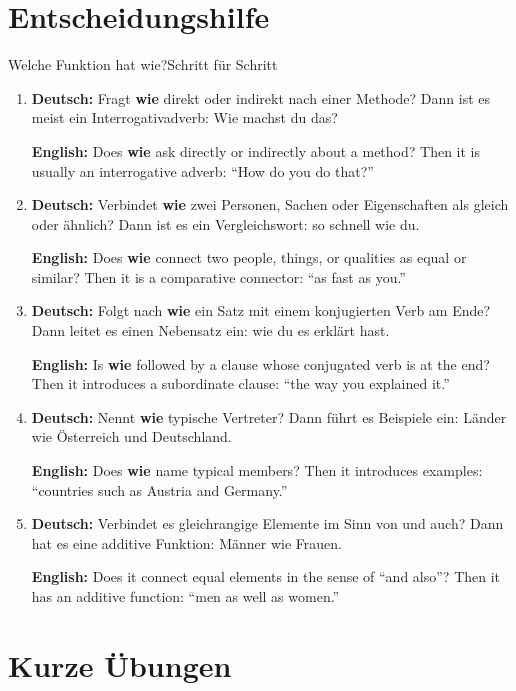 \documentclass[a4paper,11pt]{article}
\newcommand{\GermanText}[1]{\textbf{Deutsch: }#1\par}
\newcommand{\EnglishText}[1]{{\small\color{SoftGray}\textbf{English: }#1\par}}
\begin{document}
\section{Entscheidungshilfe}

\begin{grammarentry}{Welche Funktion hat \glqq wie\grqq?}{Schritt für Schritt}
\begin{enumerate}
\item \GermanText{Fragt \textbf{wie} direkt oder indirekt nach einer Methode? Dann ist es meist ein Interrogativadverb: \glqq Wie machst du das?\grqq}
\EnglishText{Does \textbf{wie} ask directly or indirectly about a method? Then it is usually an interrogative adverb: ``How do you do that?''}

\item \GermanText{Verbindet \textbf{wie} zwei Personen, Sachen oder Eigenschaften als gleich oder ähnlich? Dann ist es ein Vergleichswort: \glqq so schnell wie du\grqq.}
\EnglishText{Does \textbf{wie} connect two people, things, or qualities as equal or similar? Then it is a comparative connector: ``as fast as you.''}

\item \GermanText{Folgt nach \textbf{wie} ein Satz mit einem konjugierten Verb am Ende? Dann leitet es einen Nebensatz ein: \glqq wie du es erklärt hast\grqq.}
\EnglishText{Is \textbf{wie} followed by a clause whose conjugated verb is at the end? Then it introduces a subordinate clause: ``the way you explained it.''}

\item \GermanText{Nennt \textbf{wie} typische Vertreter? Dann führt es Beispiele ein: \glqq Länder wie Österreich und Deutschland\grqq.}
\EnglishText{Does \textbf{wie} name typical members? Then it introduces examples: ``countries such as Austria and Germany.''}

\item \GermanText{Verbindet es gleichrangige Elemente im Sinn von \glqq und auch\grqq? Dann hat es eine additive Funktion: \glqq Männer wie Frauen\grqq.}
\EnglishText{Does it connect equal elements in the sense of ``and also''? Then it has an additive function: ``men as well as women.''}
\end{enumerate}
\end{grammarentry}

\section{Kurze Übungen}
\end{document}
